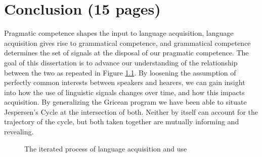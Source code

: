 \chapter{Conclusion (15 pages)}
\label{conclusion}

Pragmatic competence shapes the input to language acquisition, language acquisition gives rise to grammatical competence, and grammatical competence determines the set of signals at the disposal of our pragmatic competence. The goal of this dissertation is to advance our understanding of the relationship between the two as repeated in Figure \ref{second}. By loosening the assumption of perfectly common interests between speakers and hearers, we can gain insight into how the use of linguistic signals changes over time, and how this impacts acquisition. By generalizing the Gricean program we have been able to situate Jespersen's Cycle at the intersection of both. Neither by itself can account for the trajectory of the cycle, but both taken together are mutually informing and revealing.

\begin{figure}
\begin{center}
\end{center}
\caption{The iterated process of language acquisition and use}
\label{second}
\end{figure}
